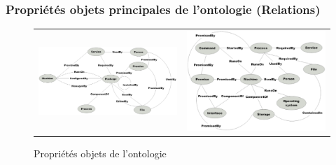 \subsubsection{Propriétés objets principales de l'ontologie (Relations)}

\begin{figure}[h]
    \centering
    \begin{tabular}{p{}p{}}
        \noindent
        \includegraphics[width=.53\textwidth]{img/ontology_relations1}
        &
        \includegraphics[width=.42\textwidth]{img/ontology_relations2}
    \end{tabular}
    \caption{Propriétés objets de l'ontologie}
    \label{fig:ontology_entities}
\end{figure}

